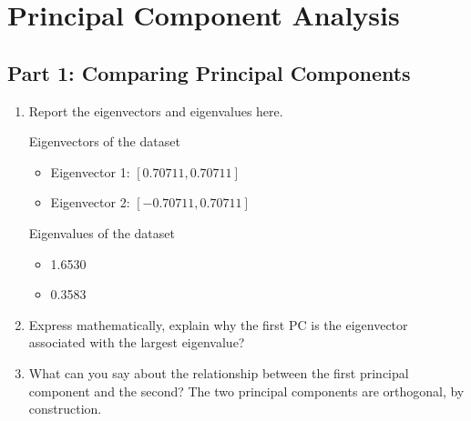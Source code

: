 \section{Principal Component Analysis}

\subsection{Part 1: Comparing Principal Components}
\begin{enumerate}
    \item Report the eigenvectors and eigenvalues here. 

Eigenvectors of the dataset
\begin{itemize}
\item Eigenvector 1: $[ 0.70711,  0.70711]$
\item Eigenvector 2: $[-0.70711,  0.70711]$
\end{itemize}

Eigenvalues of the dataset
\begin{itemize}
\item 1.6530
\item 0.3583
\end{itemize}
         \item  Express mathematically, explain why the first PC is the eigenvector associated with the largest eigenvalue?
     \newline
    \item  What can you say about the relationship between the first principal component and the second?
    \newline \newline
    The two principal components are orthogonal, by construction.
\end{enumerate}

